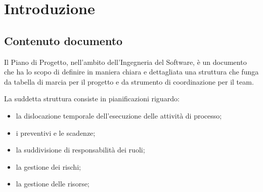 \documentclass[10pt, letterpaper]{article}
\begin{document}
\section{Introduzione}
\subsection{Contenuto documento}
Il Piano di Progetto, nell'ambito dell'Ingegneria del Software, è un documento che ha lo scopo di definire in maniera chiara e dettagliata una struttura che funga
da tabella di marcia per il progetto e da strumento di coordinazione per il team.

La suddetta struttura consiste in pianificazioni riguardo:
\begin{itemize}
    \item la dislocazione temporale dell'esecuzione delle attività di processo;
    \item i preventivi e le scadenze;
    \item la suddivisione di responsabilità dei ruoli;
    \item la gestione dei rischi;
    \item la gestione delle risorse;
\end{itemize}
\end{document}
